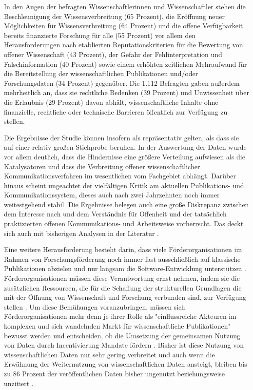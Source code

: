 In den Augen der befragten Wissenschaftlerinnen und Wissenschaftler stehen die Beschleunigung der Wissensverbreitung (65 Prozent), die Eröffnung neuer Möglichkeiten für Wissensverbreitung (64 Prozent) und die offene Verfügbarkeit bereits finanzierte Forschung für alle (55 Prozent) vor allem den Herausforderungen nach etablierten Reputationskriterien für die Bewertung von offener Wissenschaft (43 Prozent), der Gefahr der Fehlinterpretation und Falschinformation (40 Prozent) sowie einem erhöhten zeitlichen Mehraufwand für die Bereitstellung der wissenschaftlichen Publikationen und/oder Forschungsdaten (34 Prozent) gegenüber. Die 1.112 Befragten gaben außerdem mehrheitlich an, dass sie rechtliche Bedenken (39 Prozent) und Unwissenheit über die Erlaubnis (29 Prozent) davon abhält, wissenschaftliche Inhalte ohne finanzielle, rechtliche oder technische Barrieren öffentlich zur Verfügung zu stellen.

Die Ergebnisse der Studie können insofern als repräsentativ gelten, als dass sie auf einer relativ großen Stichprobe beruhen. In der Auswertung der Daten wurde vor allem deutlich, dass die Hindernisse eine größere Verteilung aufwiesen als die Katalysatoren und dass die Verbreitung offener wissenschaftlicher Kommunikationsverfahren im wesentlichen vom Fachgebiet abhängt. Darüber hinaus scheint ungeachtet der vielfältigen Kritik am aktuellen Publikations- und Kommunikationssystem, dieses auch nach zwei Jahrzehnten noch immer weitestgehend stabil. Die Ergebnisse belegen auch eine große Diskrepanz zwischen dem Interesse nach und dem Verständnis für Offenheit und der tatsächlich praktizierten offenen Kommunikations- und Arbeitsweise vorherrscht. Das deckt sich auch mit bisherigen Analysen in der Literatur \cite{yiotis_2013_open} \cite{Bartling_2013} \cite{hagner_2015_sache_buches} \cite{Fecher_2015}.

Eine weitere Herausforderung besteht darin, dass viele Förderorganisationen im Rahmen von Forschungsförderung noch immer fast ausschließlich auf klassische Publikationen abzielen und nur langsam die Software-Entwicklung unterstützen \cite{hey_2015_open}. Förderorganisationen müssen diese Verantwortung ernst nehmen, indem sie die zusätzlichen Ressourcen, die für die Schaffung der strukturellen Grundlagen die mit der Öffnung von Wissenschaft und Forschung verbunden sind, zur Verfügung stellen \cite{mennes_2013_making_os} \cite{patlak_2010_open}. Um diese Bemühungen voranzubringen, müssen sich Förderorganisationen mehr denn je ihrer Rolle als "einflussreiche  Akteuren  im  komplexen und  sich  wandelnden  Markt  für  wissenschaftliche  Publikationen" \cite{wein_2010_erwerbung} bewusst werden und entscheiden, ob die Umsetzung der gemeinsamen Nutzung von Daten durch Incentivierung Mandate fördern \cite{mennes_2013_making_os}. Bisher ist diese Nutzung von wissenschaftlichen Daten nur sehr gering verbreitet und auch wenn die Erwähnung der Weiternutzung von wissenschaftlichen Daten ansteigt, bleiben bis zu 86 Prozent der veröffentlichen Daten bisher ungenutzt beziehungsweise unzitiert \cite{peters_2015_research}.

